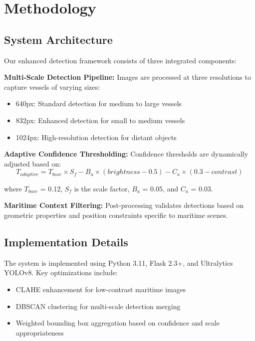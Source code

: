 \documentclass[10pt]{article}
\begin{document}
\section{Methodology}

\subsection{System Architecture}

Our enhanced detection framework consists of three integrated components:

\textbf{Multi-Scale Detection Pipeline:} Images are processed at three resolutions to capture vessels of varying sizes:
\begin{itemize}
\item 640px: Standard detection for medium to large vessels
\item 832px: Enhanced detection for small to medium vessels  
\item 1024px: High-resolution detection for distant objects
\end{itemize}

\textbf{Adaptive Confidence Thresholding:} Confidence thresholds are dynamically adjusted based on:
\begin{equation}
T_{adaptive} = T_{base} \times S_f - B_a \times (brightness - 0.5) - C_a \times (0.3 - contrast)
\end{equation}

where $T_{base}$ = 0.12, $S_f$ is the scale factor, $B_a$ = 0.05, and $C_a$ = 0.03.

\textbf{Maritime Context Filtering:} Post-processing validates detections based on geometric properties and position constraints specific to maritime scenes.

\subsection{Implementation Details}

The system is implemented using Python 3.11, Flask 2.3+, and Ultralytics YOLOv8. Key optimizations include:

\begin{itemize}
\item CLAHE enhancement for low-contrast maritime images
\item DBSCAN clustering for multi-scale detection merging
\item Weighted bounding box aggregation based on confidence and scale appropriateness
\end{itemize}
\end{document}
